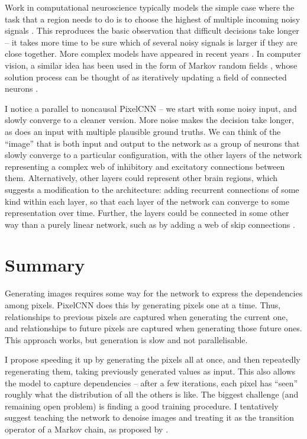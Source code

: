 \documentclass[11pt, a4paper, openany]{book}
\newcommand{\nquote}[1]{``{#1}''}
\begin{document}
Work in computational neuroscience typically models the simple case where the task that a region needs to do is to choose the highest of multiple incoming noisy signals \citep{kopecz1995saccadic,decisions1,decisions2,douglas2004neuronal,cisek2007cortical}. This reproduces the basic observation that difficult decisions take longer -- it takes more time to be sure which of several noisy signals is larger if they are close together. More complex models have appeared in recent years \citep{cisek2010neural,sandamirskaya2010embodied,dnfrobots3,dnfrobots,rcnnbio}. In computer vision, a similar idea has been used in the form of Markov random fields \citep{mrf1}, whose solution process can be thought of as iteratively updating a field of connected neurons \citep{crfrcnn}.

I notice a parallel to noncausal PixelCNN -- we start with some noisy input, and slowly converge to a cleaner version. More noise makes the decision take longer, as does an input with multiple plausible ground truths. We can think of the \nquote{image} that is both input and output to the network as a group of neurons that slowly converge to a particular configuration, with the other layers of the network representing a complex web of inhibitory and excitatory connections between them. Alternatively, other layers could represent other brain regions, which suggests a modification to the architecture: adding recurrent connections of some kind within each layer, so that each layer of the network can converge to some representation over time. Further, the layers could be connected in some other way than a purely linear network, such as by adding a web of skip connections \citep{denselyconnected}.


\section{Summary}
Generating images requires some way for the network to express the dependencies among pixels. PixelCNN does this by generating pixels one at a time. Thus, relationships to previous pixels are captured when generating the current one, and relationships to future pixels are captured when generating those future ones. This approach works, but generation is slow and not parallelisable.

I propose speeding it up by generating the pixels all at once, and then repeatedly regenerating them, taking previously generated values as input. This also allows the model to capture dependencies -- after a few iterations, each pixel has \nquote{seen} roughly what the distribution of all the others is like. The biggest challenge (and remaining open problem) is finding a good training procedure. I tentatively suggest teaching the network to denoise images and treating it as the transition operator of a Markov chain, as proposed by \citet{denoisinggenerative}.
\end{document}
